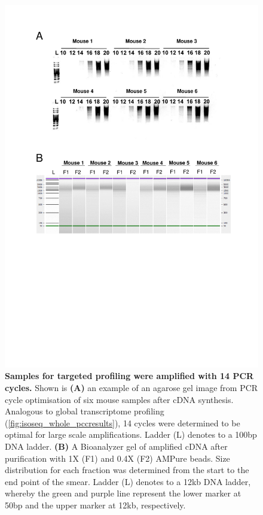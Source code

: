 \begin{figure}[htp]
	\centering
	\vspace{20pt}
	\includegraphics[page=1,trim={0 10cm 0 0cm},clip,scale = 0.75]{Figures/TargetedTranscriptome_LabResults.pdf}
	\captionsetup{width=0.95\textwidth}
	\caption[Iso-Seq targeted profiling - PCR cycle optimisation]%
	{\textbf{Samples for targeted profiling were amplified with 14 PCR cycles.} Shown is \textbf{(A)} an example of an agarose gel image from PCR cycle optimisation of six mouse samples after cDNA synthesis. Analogous to global transcriptome profiling (\cref{fig:isoseq_whole_pccresults}), 14 cycles were determined to be optimal for large scale amplifications. Ladder (L) denotes to a 100bp DNA ladder. \textbf{(B)} A Bioanalyzer gel of amplified cDNA after purification with 1X (F1) and 0.4X (F2) AMPure beads. Size distribution for each fraction was determined from the start to the end point of the smear. Ladder (L) denotes to a 12kb DNA ladder, whereby the green and purple line represent the lower marker at 50bp and the upper marker at 12kb, respectively.}
	\label{fig:isoseq_targeted_pccresults}
\end{figure}


